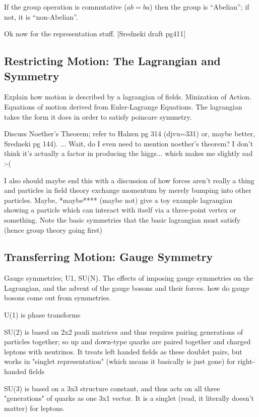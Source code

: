         If the group operation is commutative ($ab=ba$) then the group is ``Abelian''; if not, it is ``non-Abelian''.

        Ok now for the representation stuff. [Sredneki draft pg411]

        \cite{Cheng_book}

    \subsection{Restricting Motion: The Lagrangian and Symmetry}

        Explain how motion is described by a lagrangian of fields. 
        Minization of Action.
        Equations of motion derived from Euler-Lagrange Equations.
        The lagrangian takes the form it does in order to satisfy poincare symmetry.

        Discuss Noether's Theorem; refer to Halzen pg 314 (djvu=331) or, maybe better, Sredneki pg 144).
            ... Wait, do I even need to mention noether's theorem?
            I don't think it's actually a factor in producing the higgs... which makes me slightly sad :-(

        I also should maybe end this with a discussion of how forces aren't really a thing
            and particles in field theory exchange momentum by merely bumping into other particles.
        Maybe, *maybe**** (maybe not) give a toy example lagrangian showing a particle which can interact with itself via a three-point vertex or something.
        Note the basic symmetries that the basic lagrangian must satisfy (hence group theory going first)
        \cite{Halzen_book}


    \subsection{Transferring Motion: Gauge Symmetry}

        Gauge symmetries; U1, SU(N).
        The effects of imposing gauge symmetries on the Lagrangian, and the advent of the gauge bosons and their forces.
        how do gauge bosons come out from symmetries.

        U(1) is phase transforms

        SU(2) is based on 2x2 pauli matrices and thus requires pairing generations of particles together;
            so up and down-type quarks are paired together and charged leptons with neutrinos.
        It treats left handed fields as these doublet pairs,
            but works in "singlet representation" (which means it basically is just gone) for right-handed fields

        SU(3) is based on a 3x3 structure constant, and thus acts on all three "generations" of quarks as one 3x1 vector.
        It is a singlet (read, it literally doesn't matter) for leptons.
        
        \cite{Osborn_notes}
        \cite{Peskin_book}
        \cite{Halzen_book}
